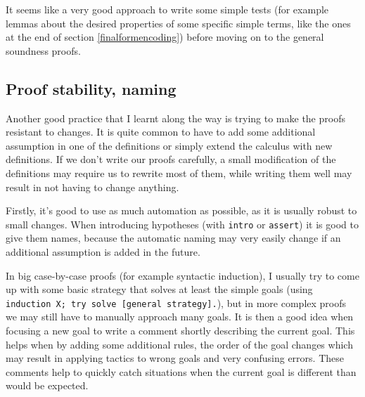 \documentclass[runningheads]{article}
\begin{document}
It seems like a very good approach to write some simple tests (for example lemmas about the desired properties of some specific simple terms, like the ones at the end of section \ref{finalformencoding}) before moving on to the general soundness proofs.



\subsection{Proof stability, naming}

Another good practice that I learnt along the way is trying to make the proofs resistant to changes. It is quite common to have to add some additional assumption in one of the definitions or simply extend the calculus with new definitions. If we don't write our proofs carefully, a small modification of the definitions may require us to rewrite most of them, while writing them well may result in not having to change anything.

Firstly, it's good to use as much automation as possible, as it is usually robust to small changes. When introducing hypotheses (with \verb|intro| or \verb|assert|) it is good to give them names, because the automatic naming may very easily change if an additional assumption is added in the future.

In big case-by-case proofs (for example syntactic induction), I usually try to come up with some basic strategy that solves at least the simple goals (using \verb|induction X; try solve [general strategy].|), but in more complex proofs we may still have to manually approach many goals. It is then a good idea when focusing a new goal to write a comment shortly describing the current goal. This helps when by adding some additional rules, the order of the goal changes which may result in applying tactics to wrong goals and very confusing errors. These comments help to quickly catch situations when the current goal is different than would be expected.
\end{document}
